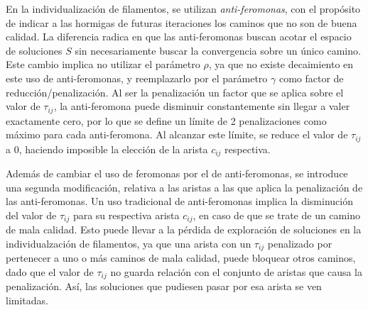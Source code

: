 En la individualizaci\'on de filamentos, se utilizan {\it anti-feromonas}, con el prop\'osito de indicar a las hormigas de futuras iteraciones los caminos que no son de buena calidad. La diferencia radica en que las anti-feromonas buscan acotar el espacio de soluciones $S$ sin necesariamente buscar la convergencia sobre un \'unico camino. Este cambio implica no utilizar el par\'ametro $\rho$, ya que no existe decaimiento en este uso de anti-feromonas, y reemplazarlo por el par\'ametro $\gamma$ como factor de reducci\'on/penalizaci\'on\cite{montgomery2002anti}. Al ser la penalizaci\'on un factor que se aplica sobre el valor de $\tau_{ij}$, la anti-feromona puede disminuir constantemente sin llegar a valer exactamente cero, por lo que se define un l\'imite de 2 penalizaciones como m\'aximo para cada anti-feromona. Al alcanzar este l\'imite, se reduce el valor de $\tau_{ij}$ a 0, haciendo imposible la elecci\'on de la arista $c_{ij}$ respectiva.

Adem\'as de cambiar el uso de feromonas por el de anti-feromonas, se introduce una segunda modificaci\'on, relativa a las aristas a las que aplica la penalizaci\'on de las anti-feromonas. Un uso tradicional de anti-feromonas implica la disminuci\'on del valor de $\tau_{ij}$ para su respectiva arista $c_{ij}$, en caso de que se trate de un camino de mala calidad. 
Esto puede llevar a la p\'erdida de exploraci\'on de soluciones en la individualzaci\'on de filamentos, ya que una arista con un $\tau_{ij}$ penalizado por pertenecer a uno o m\'as caminos de mala calidad, puede bloquear otros caminos, dado que el valor de $\tau_{ij}$ no guarda relaci\'on con el conjunto de aristas que causa la penalizaci\'on. As\'i, las soluciones que pudiesen pasar por esa arista se ven limitadas.

 

